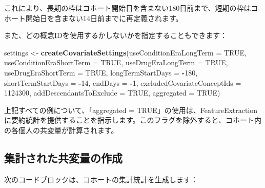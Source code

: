 \documentclass[
  11pt]{book}
\makeatletter
\newenvironment{Shaded}{\begin{snugshade}}{\end{snugshade}}
\newcommand{\AttributeTok}[1]{\textcolor[rgb]{0.13,0.29,0.53}{#1}}
\newcommand{\ConstantTok}[1]{\textcolor[rgb]{0.56,0.35,0.01}{#1}}
\newcommand{\DecValTok}[1]{\textcolor[rgb]{0.00,0.00,0.81}{#1}}
\newcommand{\FunctionTok}[1]{\textcolor[rgb]{0.13,0.29,0.53}{\textbf{#1}}}
\newcommand{\NormalTok}[1]{#1}
\newcommand{\OtherTok}[1]{\textcolor[rgb]{0.56,0.35,0.01}{#1}}
\newcommand{\SpecialCharTok}[1]{\textcolor[rgb]{0.81,0.36,0.00}{\textbf{#1}}}
\newenvironment{kframe}{%
\medskip{}
\setlength{\fboxsep}{.8em}
 \def\at@end@of@kframe{}%
 \ifinner\ifhmode%
  \def\at@end@of@kframe{\end{minipage}}%
  \begin{minipage}{\columnwidth}%
 \fi\fi%
 \def\FrameCommand##1{\hskip\@totalleftmargin \hskip-\fboxsep
 \colorbox{myShadeColor}{##1}\hskip-\fboxsep
     \hskip-\linewidth \hskip-\@totalleftmargin \hskip\columnwidth}%
 \MakeFramed {\advance\hsize-\width
   \@totalleftmargin\z@ \linewidth\hsize
   \@setminipage}}%
 {\par\unskip\endMakeFramed%
 \at@end@of@kframe}
\newenvironment{rmdblock}[1]
  {
  \begin{itemize}
  \renewcommand{\labelitemi}{
    \raisebox{-.7\height}[0pt][0pt]{
      {\setkeys{Gin}{width=3em,keepaspectratio}\texttt{[image: images/\#1]}}
    }
  }
  \setlength{\fboxsep}{1em}
  \begin{kframe}
  \item
  }
  {
  \end{kframe}
  \end{itemize}
  }
\newenvironment{rmdimportant}
  {\begin{rmdblock}{important}}
  {\end{rmdblock}}
\theoremstyle{definition}
\theoremstyle{definition}
\theoremstyle{definition}
\theoremstyle{definition}
\theoremstyle{remark}
\makeatother
\begin{document}
これにより、長期の枠はコホート開始日を含まない180日前まで、短期の枠はコホート開始日を含まない14日前までに再定義されます。

また、どの概念IDを使用するかしないかを指定することもできます：

\begin{Shaded}
\begin{Highlighting}[]
\NormalTok{settings }\OtherTok{\textless{}{-}} \FunctionTok{createCovariateSettings}\NormalTok{(}\AttributeTok{useConditionEraLongTerm =} \ConstantTok{TRUE}\NormalTok{,}
                                    \AttributeTok{useConditionEraShortTerm =} \ConstantTok{TRUE}\NormalTok{,}
                                    \AttributeTok{useDrugEraLongTerm =} \ConstantTok{TRUE}\NormalTok{,}
                                    \AttributeTok{useDrugEraShortTerm =} \ConstantTok{TRUE}\NormalTok{,}
                                    \AttributeTok{longTermStartDays =} \SpecialCharTok{{-}}\DecValTok{180}\NormalTok{,}
                                    \AttributeTok{shortTermStartDays =} \SpecialCharTok{{-}}\DecValTok{14}\NormalTok{,}
                                    \AttributeTok{endDays =} \SpecialCharTok{{-}}\DecValTok{1}\NormalTok{,}
                                    \AttributeTok{excludedCovariateConceptIds =} \DecValTok{1124300}\NormalTok{,}
                                    \AttributeTok{addDescendantsToExclude =} \ConstantTok{TRUE}\NormalTok{,}
                                    \AttributeTok{aggregated =} \ConstantTok{TRUE}\NormalTok{)}
\end{Highlighting}
\end{Shaded}

\begin{rmdimportant}
上記すべての例について、「aggregated = TRUE」の使用は、FeatureExtractionに要約統計を提供することを指示します。このフラグを除外すると、コホート内の各個人の共変量が計算されます。
\end{rmdimportant}

\subsection{集計された共変量の作成}\label{ux96c6ux8a08ux3055ux308cux305fux5171ux5909ux91cfux306eux4f5cux6210}

次のコードブロックは、コホートの集計統計を生成します：
\end{document}
